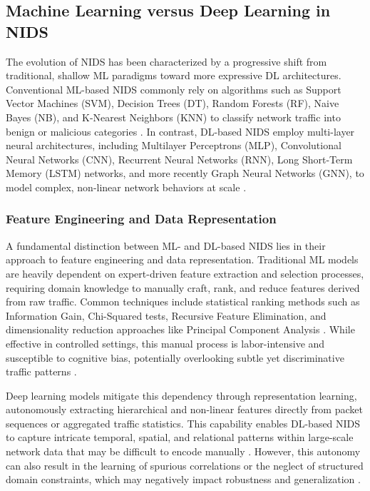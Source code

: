 \subsection{Machine Learning versus Deep Learning in NIDS}

The evolution of NIDS has been characterized by a progressive shift from traditional, shallow ML paradigms toward more expressive DL architectures. Conventional ML-based NIDS commonly rely on algorithms such as Support Vector Machines (SVM), Decision Trees (DT), Random Forests (RF), Naive Bayes (NB), and K-Nearest Neighbors (KNN) to classify network traffic into benign or malicious categories \cite{ahmed2025network, ayub2020model}. In contrast, DL-based NIDS employ multi-layer neural architectures, including Multilayer Perceptrons (MLP), Convolutional Neural Networks (CNN), Recurrent Neural Networks (RNN), Long Short-Term Memory (LSTM) networks, and more recently Graph Neural Networks (GNN), to model complex, non-linear network behaviors at scale \cite{alasad2026comprehensive}.

\subsubsection{Feature Engineering and Data Representation}

A fundamental distinction between ML- and DL-based NIDS lies in their approach to feature engineering and data representation. Traditional ML models are heavily dependent on expert-driven feature extraction and selection processes, requiring domain knowledge to manually craft, rank, and reduce features derived from raw traffic. Common techniques include statistical ranking methods such as Information Gain, Chi-Squared tests, Recursive Feature Elimination, and dimensionality reduction approaches like Principal Component Analysis \cite{neupane2022explainable, hartl2020explainability, vitorino2025reliable}. While effective in controlled settings, this manual process is labor-intensive and susceptible to cognitive bias, potentially overlooking subtle yet discriminative traffic patterns \cite{ennaji2025adversarial}.

Deep learning models mitigate this dependency through representation learning, autonomously extracting hierarchical and non-linear features directly from packet sequences or aggregated traffic statistics. This capability enables DL-based NIDS to capture intricate temporal, spatial, and relational patterns within large-scale network data that may be difficult to encode manually \cite{doriguzzi2020lucid, abou2020investigating}. However, this autonomy can also result in the learning of spurious correlations or the neglect of structured domain constraints, which may negatively impact robustness and generalization \cite{guo2025knowml}.

